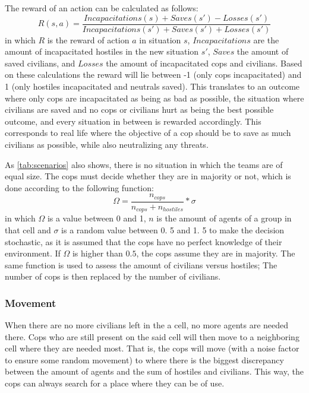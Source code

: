 The reward of an action can be calculated as follows: 
\begin{equation} \label{eq:reward}
R(s,a) = \frac{Incapacitations(s) + Saves(s') - Losses(s')}{Incapacitations(s') + Saves(s') + Losses(s')}
\end{equation}
in which $R$ is the reward of action $a$ in situation $s$, $Incapacitations$ are the amount of incapacitated hostiles in the new situation $s'$, $Saves$ the amount of saved civilians, and $Losses$ the amount of incapacitated cops and civilians.
Based on these calculations the reward will lie between -1 (only cops incapacitated) and 1 (only hostiles incapacitated and neutrals saved).
This translates to an outcome where only cops are incapacitated as being as bad as possible,
the situation where civilians are saved and no cops or civilians hurt as being the best possible outcome,
and every situation in between is rewarded accordingly.
This corresponds to real life where the objective of a cop should be to save as much civilians as possible, 
while also neutralizing any threats.

As \autoref{tab:scenarios} also shows, there is no situation in which the teams are of equal size.
The cops must decide whether they are in majority or not, which is done according to the following function:
\begin{equation} \label{eq:omega}
\Omega = \frac{n_{cops}}{n_{cops} + n_{hostiles}}*\sigma 
\end{equation}
in which $\Omega$ is a value between 0 and 1, $n$ is the amount of agents of a group in that cell and $\sigma$ is a random value between 0.
5 and 1.
5 to make the decision stochastic, as it is assumed that the cops have no perfect knowledge of their environment.
If $\Omega$ is higher than $0.
5$, the cops assume they are in majority.
The same function is used to assess the amount of civilians versus hostiles; The number of cops is then replaced by the number of civilians.

\subsubsection{Movement}
When there are no more civilians left in the a cell, no more agents are needed there.
Cops who are still present on the said cell will then move to a neighboring cell where they are needed most.
That is, the cops will move (with a noise factor to ensure some random movement) to where there is the biggest discrepancy between the amount of agents and the sum of hostiles and civilians.
This way, the cops can always search for a place where they can be of use.

